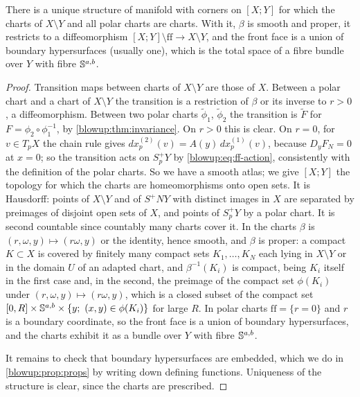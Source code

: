 \begin{theorem}\label{blowup:thm:blowup}
There is a unique structure of manifold with corners on $[X;Y]$ for which the charts of
$X\setminus Y$ and all polar charts are charts. With it, $\beta$ is smooth and proper, it
restricts to a diffeomorphism $[X;Y]\setminus\mathrm{ff}\to X\setminus Y$, and the front face
is a union of boundary hypersurfaces (usually one), which is the total space of a fibre bundle over $Y$ with fibre $\mathbb{S}^{a,b}$.
\end{theorem}
\begin{proof}
Transition maps between charts of $X\setminus Y$ are those of $X$. Between a polar chart
and a chart of $X\setminus Y$ the transition is a restriction of $\beta$ or its inverse to
$r>0$, a diffeomorphism. Between two polar charts $\tilde\phi_1$, $\tilde\phi_2$ the
transition is $\widetilde F$ for $F=\phi_2\circ\phi_1^{-1}$, by
\cref{blowup:thm:invariance}. On $r>0$ this is clear. On $r=0$, for $v\in T_pX$ the chain
rule gives $dx^{(2)}_p(v)=A(y)\,dx^{(1)}_p(v)$, because $D_yF_N=0$ at $x=0$; so the
transition acts on $S^+_pY$ by \eqref{blowup:eq:ff-action}, consistently with the
definition of the polar charts. So we
have a smooth atlas; we give $[X;Y]$ the topology for which the charts are homeomorphisms
onto open sets. It is Hausdorff: points of $X\setminus Y$ and of $S^+NY$ with distinct
images in $X$ are separated by preimages of disjoint open sets of $X$, and points of
$S^+_pY$ by a polar chart. It is second countable since countably many charts cover it.
In the charts $\beta$ is $(r,\omega,y)\mapsto(r\omega,y)$ or the identity, hence smooth,
and $\beta$ is proper: a compact $K\subset X$ is covered by finitely many compact sets
$K_1,\dots,K_N$ each lying in $X\setminus Y$ or in the domain $U$ of an adapted chart, and
$\beta^{-1}(K_i)$ is compact, being $K_i$ itself in the first case and, in the second, the
preimage of the compact set $\phi(K_i)$ under $(r,\omega,y)\mapsto(r\omega,y)$, which is a closed
subset of the compact set $[0,R]\times\Sphere^{a,b}\times\{y;\ (x,y)\in\phi(K_i)\}$ for large $R$. In polar charts $\mathrm{ff}=\{r=0\}$ and $r$ is a boundary
coordinate, so the front face is a union of boundary hypersurfaces, and the charts
exhibit it as a bundle over $Y$ with fibre $\mathbb{S}^{a,b}$.

It remains to check that boundary hypersurfaces are embedded, which we do in
\cref{blowup:prop:props} by writing down defining functions. Uniqueness of the
structure is clear, since the charts are prescribed.
\end{proof}

